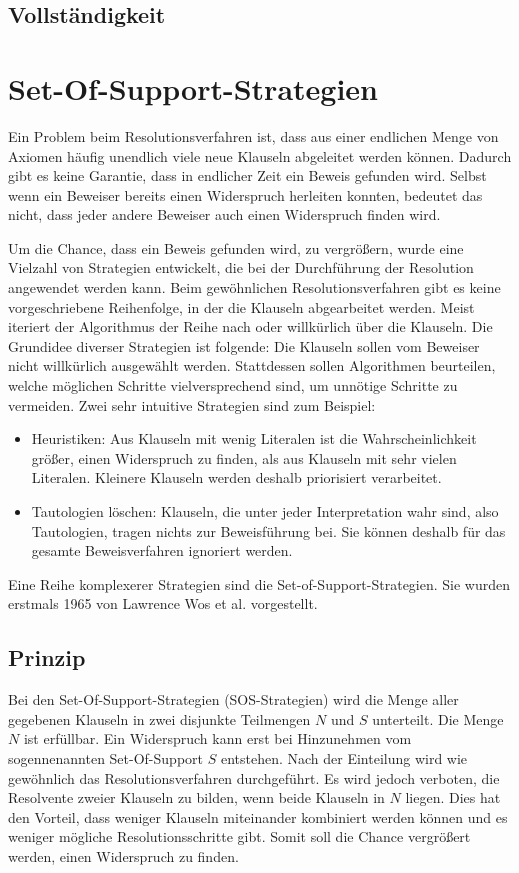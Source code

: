 		\subsection{Vollständigkeit}
	
	\section{Set-Of-Support-Strategien}
Ein Problem beim Resolutionsverfahren ist, dass aus einer endlichen Menge von Axiomen häufig unendlich viele neue Klauseln abgeleitet werden können. Dadurch gibt es keine Garantie, dass in endlicher Zeit ein Beweis gefunden wird. Selbst wenn ein Beweiser bereits einen Widerspruch herleiten konnten, bedeutet das nicht, dass jeder andere Beweiser auch einen Widerspruch finden wird.

Um die Chance, dass ein Beweis gefunden wird, zu vergrößern, wurde eine Vielzahl von Strategien entwickelt, die bei der Durchführung der Resolution angewendet werden kann. Beim gewöhnlichen Resolutionsverfahren gibt es keine vorgeschriebene Reihenfolge, in der die Klauseln abgearbeitet werden. Meist iteriert der Algorithmus der Reihe nach oder willkürlich über die Klauseln. Die Grundidee diverser Strategien ist folgende: Die Klauseln sollen vom Beweiser nicht willkürlich ausgewählt werden. Stattdessen sollen Algorithmen beurteilen, welche möglichen Schritte vielversprechend sind, um unnötige Schritte zu vermeiden. Zwei sehr intuitive Strategien sind zum Beispiel:
\begin{itemize}
	\item Heuristiken: Aus Klauseln mit wenig Literalen ist die Wahrscheinlichkeit größer, einen Widerspruch zu finden, als aus Klauseln mit sehr vielen Literalen. Kleinere Klauseln werden deshalb priorisiert verarbeitet.
	\item Tautologien löschen: Klauseln, die unter jeder Interpretation wahr sind, also Tautologien, tragen nichts zur Beweisführung bei. Sie können deshalb für das gesamte Beweisverfahren ignoriert werden.
\end{itemize}

Eine Reihe komplexerer Strategien sind die Set-of-Support-Strategien. Sie wurden erstmals 1965 von Lawrence Wos et al. vorgestellt. \cite{Wos1965Sos}

		\subsection{Prinzip}
Bei den Set-Of-Support-Strategien (SOS-Strategien) wird die Menge aller gegebenen Klauseln in zwei disjunkte Teilmengen $N$ und $S$ unterteilt. Die Menge $N$ ist erfüllbar. Ein Widerspruch kann erst bei Hinzunehmen vom sogennenannten Set-Of-Support $S$ entstehen. Nach der Einteilung wird wie gewöhnlich das Resolutionsverfahren durchgeführt. Es wird jedoch verboten, die Resolvente zweier Klauseln zu bilden, wenn beide Klauseln in $N$ liegen. Dies hat den Vorteil, dass weniger Klauseln miteinander kombiniert werden können und es weniger mögliche Resolutionsschritte gibt. Somit soll die Chance vergrößert werden, einen Widerspruch zu finden.


